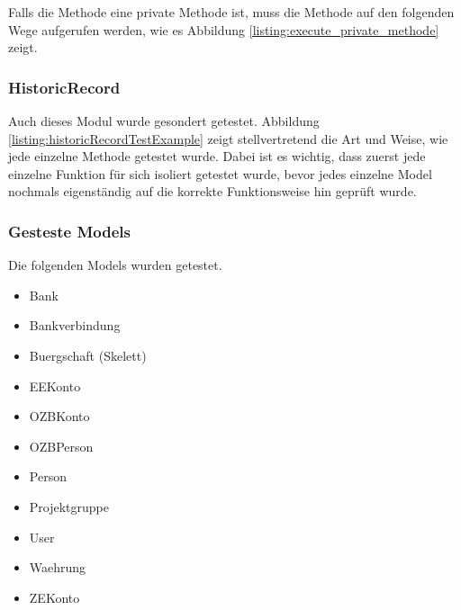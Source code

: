 \documentclass[12pt,             %
               a4paper,          %
               listof=totoc,     %
               index=totoc,      %
               bibliography=totoc,%
               oneside,         %
               BCOR1cm,          %
               english   %
               ]{scrbook}
\begin{document}
\label{listing:default_test_instance_methods}

Falls die Methode eine private Methode ist, muss die Methode auf den folgenden Wege aufgerufen werden, wie es Abbildung \vref{listing:execute_private_methode} zeigt.

\label{listing:execute_private_methode}

\subsubsection{HistoricRecord}
Auch dieses Modul wurde gesondert getestet. Abbildung \vref{listing:historicRecordTestExample} zeigt stellvertretend die Art und Weise, wie jede einzelne Methode getestet wurde. Dabei ist es wichtig, dass zuerst jede einzelne Funktion für sich isoliert getestet wurde, bevor jedes einzelne Model nochmals eigenständig auf die korrekte Funktionsweise hin geprüft wurde.

 \label{listing:historicRecordTestExample}


\subsubsection{Gesteste Models}
Die folgenden Models wurden getestet.

\begin{itemize}
     \item{Bank}
     \item{Bankverbindung}
     \item{Buergschaft (Skelett)}
     \item{EEKonto}
     \item{OZBKonto}
     \item{OZBPerson}
     \item{Person}
     \item{Projektgruppe}
     \item{User}
     \item{Waehrung}
     \item{ZEKonto}
\end{itemize}
\end{document}
